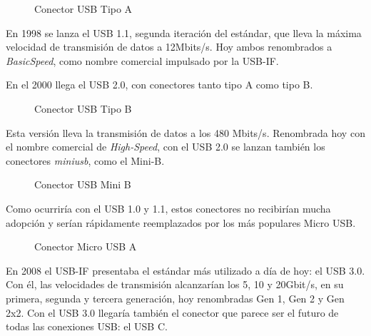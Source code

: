 \documentclass[12pt]{article}
\begin{document}
\begin{figure}[h]
	\vspace{20pt}
	\centering
	
	\caption{Conector USB Tipo A}
	\vspace{15pt}
\end{figure}

En 1998 se lanza el USB 1.1,
segunda iteración del estándar,
que lleva la máxima velocidad de transmisión de datos a 12Mbits/s.
Hoy ambos renombrados a \textit{BasicSpeed},
como nombre comercial impulsado por la USB-IF.

En el 2000 llega el USB 2.0,
con conectores tanto tipo A como tipo B.

\begin{figure}[h]
	\vspace{20pt}
	\centering
	
	\caption{Conector USB Tipo B}
	\vspace{15pt}
\end{figure}

Esta versión lleva la transmisión de datos a los 480 Mbits/s.
Renombrada hoy con el nombre comercial de \textit{High-Speed},
con el USB 2.0 se lanzan también los conectores \textit{miniusb},
como el Mini-B.

\begin{figure}[h]
	\vspace{20pt}
	\centering
	
	\caption{Conector USB Mini B}
	\vspace{15pt}
\end{figure}

Como ocurriría con el USB 1.0 y 1.1,
estos conectores no recibirían mucha adopción y serían rápidamente reemplazados
por los más populares Micro USB.

\begin{figure}[h]
	\vspace{20pt}
	\centering
	
	\caption{Conector Micro USB A}
	\vspace{15pt}
\end{figure}

En 2008 el USB-IF presentaba el estándar más utilizado a día de hoy:
el USB 3.0. Con él, las velocidades de transmisión alcanzarían los 5, 10 y 20Gbit/s,
en su primera, segunda y tercera generación, 
hoy renombradas Gen 1, Gen 2 y Gen 2x2.
Con el USB 3.0 llegaría también el conector que parece ser el futuro de todas las conexiones USB:
el USB C.
\end{document}
